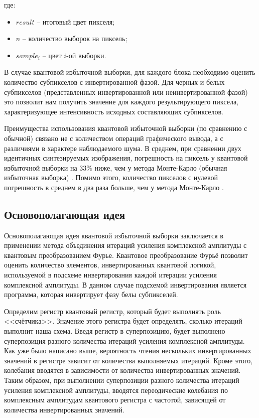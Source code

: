 где:

\begin{itemize}
\item $result$ -- итоговый цвет пикселя;
\item $n$ -- количество выборок на пиксель;
\item $sample_{i}$ -- цвет $i$-ой выборки.
\end{itemize}

В случае квантовой избыточной выборки, для каждого блока необходимо оценить количество субпикселов с инвертированной фазой. Для черных и белых субпикселов (представленных инвертированной или неинвертированной фазой) это позволит нам получить значение для каждого результирующего пиксела, характеризующее интенсивность исходных составляющих субпикселов.

Преимущества использования квантовой избыточной выборки (по сравнению с обычной) связано не с количеством операций графического вывода, а с различиями в характере наблюдаемого шума. В среднем, при сравнении двух идентичных синтезируемых изображения, погрешность на пиксель у квантовой избыточной выборки на 33\% ниже, чем у метода Монте-Карло (обычная избыточная выборка) \cite{PQC}. Помимо этого, количество пикселов с нулевой погрешность в среднем в два раза больше, чем у метода Монте-Карло \cite{PQC}.

\subsection{Основополагающая идея}

Основополагающая идея квантовой избыточной выборки заключается в применении метода объединения итераций усиления комплексной амплитуды с квантовым преобразованием Фурье. Квантовое преобразование Фурьё позволит оценить количество элементов, инвертированных квантовой логикой, используемой в подсхеме инвертирования каждой итерации усиления комплексной амплитуды. В данном случае подсхемой инвертирования является программа, которая инвертирует фазу белы субпикселей.

Определим регистр квантовый регистр, который будет выполнять роль <<счётчика>>. Значение этого регистра будет определять, сколько итераций выполнит наша схема. Введя регистр в суперпозицию, будет выполнено суперпозиция разного количества итераций усиления комплексной амплитуды. Как уже было написано выше, вероятность чтения нескольких инвертированных значений в регистре зависит от количества выполняемых итераций. Кроме этого, колебания вводятся в зависимости от количества инвертированных значений. Таким образом, при выполнении суперпозиции разного количества итераций усиления комплексной амплитуды, вводятся переодические колебания по комплексным амплитудам квантового регистра с частотой, зависящей от количества инвертированных значений.

